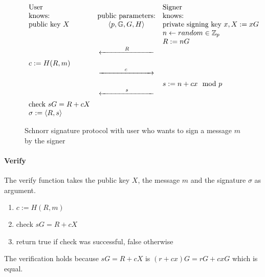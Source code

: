 \begin{figure}
    \begin{equation*}
        \begin{array}{ l c l }
            \text{User} &  & \text{Signer}
            \\ \text{knows:} & \text{public parameters:} & \text{knows:}
            \\ \text{public key } X & \langle p, \mathbb{G}, G, H\rangle & \text{private signing key } x, X := xG
            \\ & & n \leftarrow random \in \mathbb{Z}_p
            \\ & & R := nG
            \\ & \xleftarrow[\rule{2.5cm}{0pt}]{R} &
            \\ c := H(R,m)
            \\ & \xrightarrow[\rule{2.5cm}{0pt}]{c} &
            \\ & & s := n+cx \mod p
            \\ & \xleftarrow[\rule{2.5cm}{0pt}]{s} &
            \\ \text{check } sG = R + cX
            \\ \sigma := \langle R,s \rangle
        \end{array}
    \end{equation*}
    \caption{Schnorr signature protocol with user who wants to sign a message $m$ by the signer}
    \label{fig:schnorr-sign-protocol}
\end{figure}


\paragraph{Verify}
The verify function takes the public key $X$, the message $m$ and the signature $\sigma$ as argument.
\begin{enumerate}
    \item $ c := H(R,m)$
    \item check $sG = R + cX$
    \item return true if check was successful, false otherwise
\end{enumerate}

The verification holds because $sG = R + cX  $ is $ (r + cx)G = rG + cxG$ which is equal.

